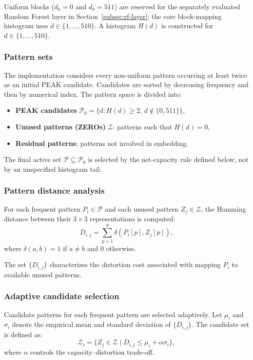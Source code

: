 \documentclass[a4paper,fleqn]{cas-dc}
\begin{document}
Uniform blocks ($d_k = 0$ and $d_k = 511$) are reserved for the separately
evaluated Random Forest layer in Section~\ref{subsec:rf-layer}; the core
block-mapping histogram uses $d\in\{1,\ldots,510\}$.
A histogram $H(d)$ is constructed for $d \in \{1,\ldots,510\}$.

\subsubsection*{Pattern sets}

The implementation considers every non-uniform pattern occurring at least
twice as an initial PEAK candidate. Candidates are sorted by decreasing
frequency and then by numerical index. The pattern space is divided into:
\begin{itemize}
    \item \textbf{PEAK candidates} $\mathcal{P}_0=\{d:H(d)\geq2,\,
    d\notin\{0,511\}\}$,
    \item \textbf{Unused patterns (ZEROs)} $\mathcal{Z}$: patterns such that $H(d)=0$,
    \item \textbf{Residual patterns}: patterns not involved in embedding.
\end{itemize}

The final active set $\mathcal{P}\subseteq\mathcal{P}_0$ is selected by the
net-capacity rule defined below, not by an unspecified histogram tail.

\subsubsection*{Pattern distance analysis}

For each frequent pattern $P_i \in \mathcal{P}$ and each unused pattern $Z_j \in \mathcal{Z}$,
the Hamming distance between their $3 \times 3$ representations is computed:
\[
D_{i,j} = \sum_{p=1}^{9} \delta(P_i[p], Z_j[p]),
\]
where $\delta(a,b)=1$ if $a\neq b$ and $0$ otherwise.

The set $\{D_{i,j}\}$ characterizes the distortion cost associated with mapping $P_i$ to available unused patterns.

\subsubsection*{Adaptive candidate selection}

Candidate patterns for each frequent pattern are selected adaptively.
Let $\mu_i$ and $\sigma_i$ denote the empirical mean and standard deviation of $\{D_{i,j}\}$.
The candidate set is defined as:
\[
\mathcal{Z}_i = \{ Z_j \in \mathcal{Z} \mid D_{i,j} \le \mu_i + \alpha \sigma_i \},
\]
where $\alpha$ controls the capacity--distortion trade-off.
\end{document}
